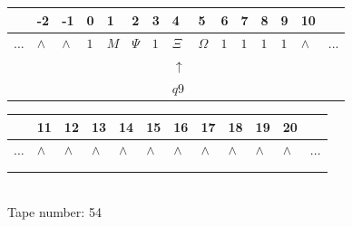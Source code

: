 \documentclass[11pt]{article}
\begin{document}
\begin{table}[H]
\centering
\begin{tabular}{lllllllllllllll}
 & -2 & -1 & 0 & 1 & 2 & 3 & 4 & 5 & 6 & 7 & 8 & 9 & 10 & \\
\hline
$...$ & \multicolumn{1}{|l|}{$\wedge$} & \multicolumn{1}{|l|}{$\wedge$} & \multicolumn{1}{|l|}{$1$} & \multicolumn{1}{|l|}{$M$} & \multicolumn{1}{|l|}{$\Psi$} & \multicolumn{1}{|l|}{$1$} & \multicolumn{1}{|l|}{$\Xi$} & \multicolumn{1}{|l|}{$\Omega$} & \multicolumn{1}{|l|}{$1$} & \multicolumn{1}{|l|}{$1$} & \multicolumn{1}{|l|}{$1$} & \multicolumn{1}{|l|}{$1$} & \multicolumn{1}{|l|}{$\wedge$} & $...$\\
\hline
&  &  &  &  &  &  & $\uparrow$ &  &  &  &  &  &  &  \\
&  &  &  &  &  &  & $ q9 $ &  &  &  &  &  &  &  \\
\end{tabular}
\begin{tabular}{llllllllllll}
 & 11 & 12 & 13 & 14 & 15 & 16 & 17 & 18 & 19 & 20 & \\
\hline
$...$ & \multicolumn{1}{|l|}{$\wedge$} & \multicolumn{1}{|l|}{$\wedge$} & \multicolumn{1}{|l|}{$\wedge$} & \multicolumn{1}{|l|}{$\wedge$} & \multicolumn{1}{|l|}{$\wedge$} & \multicolumn{1}{|l|}{$\wedge$} & \multicolumn{1}{|l|}{$\wedge$} & \multicolumn{1}{|l|}{$\wedge$} & \multicolumn{1}{|l|}{$\wedge$} & \multicolumn{1}{|l|}{$\wedge$} & $...$\\
\hline
&  &  &  &  &  &  &  &  &  &  &  \\
&  &  &  &  &  &  &  &  &  &  &  \\
\end{tabular}
\\
Tape number: 54
\noindent\makebox[\linewidth]{\hdashrule{\textwidth}{1pt}{1pt}}\end{table}
\end{document}
